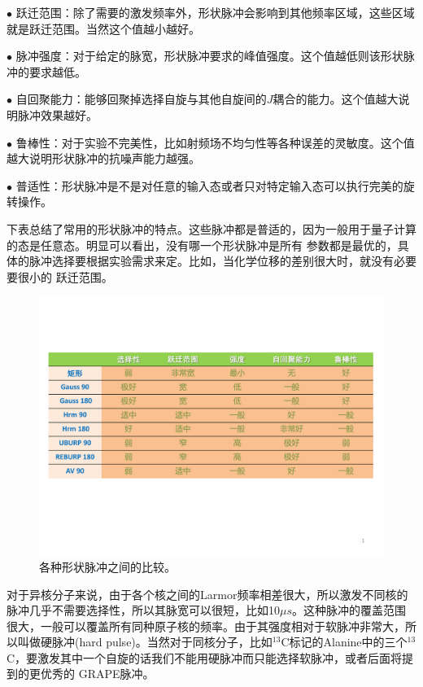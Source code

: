 $\bullet$ 跃迁范围：除了需要的激发频率外，形状脉冲会影响到其他频率区域，这些区域就是跃迁范围。当然这个值越小越好。

$\bullet$ 脉冲强度：对于给定的脉宽，形状脉冲要求的峰值强度。这个值越低则该形状脉冲的要求越低。

 $\bullet$
 自回聚能力：能够回聚掉选择自旋与其他自旋间的$J$耦合的能力。这个值越大说明脉冲效果越好。

  $\bullet$
  鲁棒性：对于实验不完美性，比如射频场不均匀性等各种误差的灵敏度。这个值越大说明形状脉冲的抗噪声能力越强。

$\bullet$
普适性：形状脉冲是不是对任意的输入态或者只对特定输入态可以执行完美的旋转操作。

下表总结了常用的形状脉冲的特点\cite{shape1,shape2,shape3,shape4}。这些脉冲都是普适的，因为一般用于量子计算的态是任意态。明显可以看出，没有哪一个形状脉冲是所有
参数都是最优的，具体的脉冲选择要根据实验需求来定。比如，当化学位移的差别很大时，就没有必要要很小的
跃迁范围。

\begin{figure}[htbp]
            \begin{center}
              \includegraphics[width= 0.8\columnwidth]{figures/shapepara.pdf}
              \caption{各种形状脉冲之间的比较。
              }
              \label{shapepara}
            \end{center}
\end{figure}

对于异核分子来说，由于各个核之间的Larmor频率相差很大，所以激发不同核的脉冲几乎不需要选择性，所以其脉宽可以很短，比如10$\mu s$。这种脉冲的覆盖范围很大，一般可以覆盖所有同种原子核的频率。由于其强度相对于软脉冲非常大，所以叫做硬脉冲(hard pulse)。当然对于同核分子，比如$^{13}$C标记的Alanine中的三个$^{13}$C，要激发其中一个自旋的话我们不能用硬脉冲而只能选择软脉冲，或者后面将提到的更优秀的
GRAPE脉冲。

